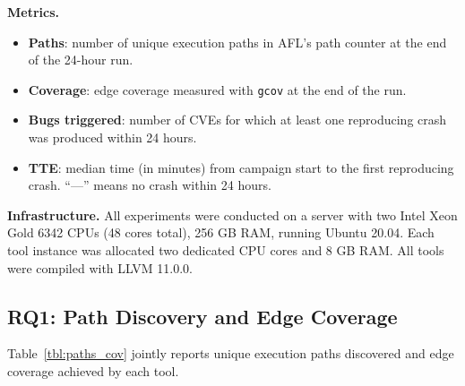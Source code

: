 \documentclass[preprint,12pt,3p]{elsarticle}
\begin{document}
\textbf{Metrics.}
\begin{itemize}
  \item \textbf{Paths}: number of unique execution paths in AFL's path counter
    at the end of the 24-hour run.
  \item \textbf{Coverage}: edge coverage measured with \texttt{gcov} at the
    end of the run.
  \item \textbf{Bugs triggered}: number of CVEs for which at least one
    reproducing crash was produced within 24 hours.
  \item \textbf{TTE}: median time (in minutes) from campaign start to the
    first reproducing crash.  ``---'' means no crash within 24 hours.
\end{itemize}

\textbf{Infrastructure.}  All experiments were conducted on a server with two
Intel Xeon Gold 6342 CPUs (48 cores total), 256 GB RAM, running Ubuntu 20.04.
Each tool instance was allocated two dedicated CPU cores and 8 GB RAM.  All
tools were compiled with LLVM 11.0.0.

\subsection{RQ1: Path Discovery and Edge Coverage}

Table~\ref{tbl:paths_cov} jointly reports unique execution paths discovered
and edge coverage achieved by each tool.
\end{document}
